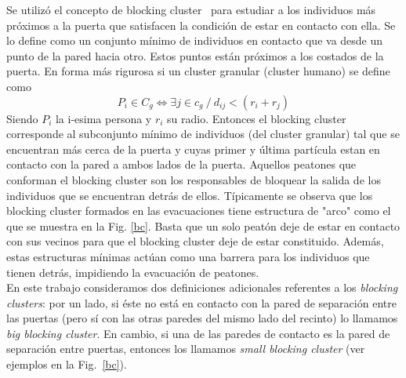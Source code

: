 Se utilizó el concepto de blocking cluster~\cite{Dorso1} para estudiar a los individuos más próximos a la puerta que satisfacen la condición de estar en contacto con ella.
Se lo define como un conjunto mínimo de individuos en contacto que va desde un punto de la pared hacia otro. Estos puntos están próximos a los costados de la puerta. En forma más rigurosa si un cluster granular (cluster humano) se define como 
\begin{equation}
P_i \in C_g \Longleftrightarrow \exists j \in c_g ~/~ d_{ij}<(r_i+r_j)
\end{equation} 
Siendo $P_i$  la i-esima persona y $r_i$ su radio. Entonces el blocking cluster corresponde al subconjunto mínimo de individuos (del cluster granular) tal que se encuentran más cerca de la puerta y cuyas primer y última partícula estan en contacto con la pared a ambos lados de la puerta.   
Aquellos peatones que conforman el blocking cluster son los responsables de bloquear la salida de los individuos que se encuentran detrás de ellos. Típicamente se observa que los blocking cluster formados en las evacuaciones tiene estructura de "arco" como el que se muestra en la Fig. \ref{bc}. Basta que un solo peatón deje de estar en contacto con sus vecinos para que el blocking cluster deje de estar constituido. Además, estas estructuras mínimas actúan como una barrera para los individuos que tienen detrás, impidiendo la evacuación de peatones. \\

En este trabajo consideramos dos definiciones adicionales referentes a los \textit{blocking clusters}: por un lado, si éste no está en contacto con la pared de separación entre las puertas (pero sí con las otras paredes del mismo lado del recinto) lo llamamos \textit{big blocking cluster}. En cambio, si una de las paredes de contacto es la pared de separación entre puertas, entonces los llamamos \textit{small blocking cluster} (ver ejemplos en la Fig.~\ref{bc}).

